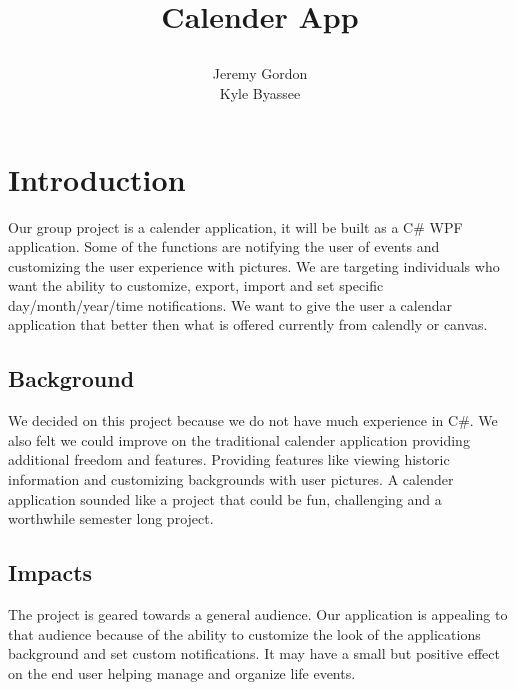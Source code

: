 \documentclass[10pt,conference,onecolumn,compsoc]{IEEEtran}
\begin{document}
\title{Calender App
%
%


\author{Jeremy Gordon\\ Kyle Byassee%
}
}

\maketitle
\IEEEdisplaynontitleabstractindextext
\IEEEpeerreviewmaketitle

\section{Introduction}
Our group project is a calender application, it will be built as a C\# WPF application. Some of the functions are notifying the user of events and customizing the user experience with pictures. We are targeting individuals who want the ability to customize, export, import and set specific day/month/year/time notifications. 
We want to give the user a calendar application that better then what is offered currently from calendly or canvas.

\subsection{Background}
We decided on this project because we do not have much experience in C\#. We also felt we could improve on the traditional calender application providing additional freedom and features. Providing features like viewing historic information and customizing backgrounds with user pictures. A calender application sounded like a project that could be fun, challenging and a worthwhile semester long project.

\subsection{Impacts}
The project is geared towards a general audience. Our application is appealing to that audience because of the ability to customize the look of the applications background and set custom notifications. It may have a small but positive effect on the end user helping manage and organize life events.
\end{document}
